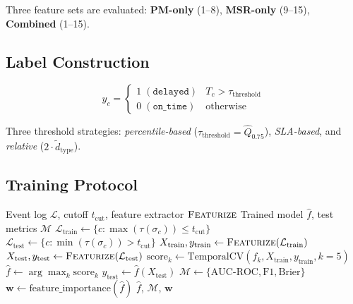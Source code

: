 Three feature sets are evaluated: \textbf{PM-only} (1--8),
\textbf{MSR-only} (9--15), \textbf{Combined} (1--15).


\subsection{Label Construction}
\label{sec:ml-labels}

\begin{definition}
\label{def:label}
\begin{equation}
\label{eq:label}
y_c = \begin{cases}
    1 \; (\texttt{delayed})  & T_c > \tau_{\text{threshold}} \\
    0 \; (\texttt{on\_time}) & \text{otherwise}
\end{cases}
\end{equation}
\end{definition}

Three threshold strategies: \emph{percentile-based}
($\tau_{\text{threshold}} = \hat{Q}_{0.75}$), \emph{SLA-based}, and
\emph{relative} ($2 \cdot \tilde{d}_{\text{type}}$).


\subsection{Training Protocol}
\label{sec:ml-training}

\begin{algorithm}[htbp]
\caption{ML Training with Temporal Hold-Out}
\label{alg:ml-training}
\begin{algorithmic}[1]
\REQUIRE Event log $\mathcal{L}$, cutoff $t_{\text{cut}}$,
    feature extractor $\textsc{Featurize}$
\ENSURE Trained model $\hat{f}$, test metrics $\mathcal{M}$
\STATE $\mathcal{L}_{\text{train}} \gets \{c : \max(\tau(\sigma_c)) \leq t_{\text{cut}}\}$
\STATE $\mathcal{L}_{\text{test}}  \gets \{c : \min(\tau(\sigma_c)) >    t_{\text{cut}}\}$
\STATE $X_{\text{train}}, y_{\text{train}} \gets \textsc{Featurize}(\mathcal{L}_{\text{train}})$
\STATE $X_{\text{test}},  y_{\text{test}}  \gets \textsc{Featurize}(\mathcal{L}_{\text{test}})$
    \STATE $\text{score}_k \gets \text{TemporalCV}(f_k, X_{\text{train}}, y_{\text{train}}, k=5)$
\ENDFOR
\STATE $\hat{f} \gets \arg\max_k \text{score}_k$
\STATE $\hat{y}_{\text{test}} \gets \hat{f}(X_{\text{test}})$
\STATE $\mathcal{M} \gets \{\text{AUC-ROC}, \text{F1}, \text{Brier}\}$
\STATE $\mathbf{w} \gets \text{feature\_importance}(\hat{f})$
\RETURN $\hat{f}$, $\mathcal{M}$, $\mathbf{w}$
\end{algorithmic}
\end{algorithm}


